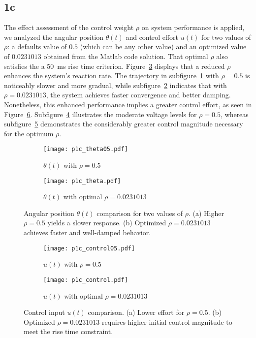 \documentclass{article}
\begin{document}
\subsection*{1c}
The effect assessment of the control weight $\rho$ on system performance is applied, we analyzed the angular position $\theta(t)$ and control effort $u(t)$ for two values of $\rho$: a defaults value of $0.5$ (which can be any other value) and an optimized value of $0.0231013$ obtained from the Matlab code solution. That optimal $\rho$ also satisfies the a 50~ms rise time criterion.
Figure~\ref{fig:theta_comparison} displays that a reduced $\rho$ enhances the system's reaction rate. The trajectory in subfigure~\ref{fig:theta_a} with $\rho = 0.5$ is noticeably slower and more gradual, while subfigure~\ref{fig:theta_b} indicates that with $\rho = 0.0231013$, the system achieves faster convergence and better damping. Nonetheless, this enhanced performance implies a greater control effort, as seen in Figure~\ref{fig:control_comparison}. Subfigure~\ref{fig:control_a} illustrates the moderate voltage levels for $\rho = 0.5$, whereas subfigure~\ref{fig:control_b} demonstrates the considerably greater control magnitude necessary for the optimum $\rho$.

\begin{figure}[H]
    \centering
    \begin{subfigure}[b]{0.45\textwidth}
        \centering
        \texttt{[image: p1c\_theta05.pdf]}
        \caption{$\theta(t)$ with $\rho = 0.5$}
        \label{fig:theta_a}
    \end{subfigure}
    \hfill
    \begin{subfigure}[b]{0.45\textwidth}
        \centering
        \texttt{[image: p1c\_theta.pdf]}
        \caption{$\theta(t)$ with optimal $\rho = 0.0231013$}
        \label{fig:theta_b}
    \end{subfigure}
    \caption{Angular position $\theta(t)$ comparison for two values of $\rho$. (a) Higher $\rho = 0.5$ yields a slower response. (b) Optimized $\rho = 0.0231013$ achieves faster and well-damped behavior.}
    \label{fig:theta_comparison}
\end{figure}
\begin{figure}[H]
    \centering
    \begin{subfigure}[b]{0.45\textwidth}
        \centering
        \texttt{[image: p1c\_control05.pdf]}
        \caption{$u(t)$ with $\rho = 0.5$}
        \label{fig:control_a}
    \end{subfigure}
    \hfill
    \begin{subfigure}[b]{0.45\textwidth}
        \centering
        \texttt{[image: p1c\_control.pdf]}
        \caption{$u(t)$ with optimal $\rho = 0.0231013$}
        \label{fig:control_b}
    \end{subfigure}
    \caption{Control input $u(t)$ comparison. (a) Lower effort for $\rho = 0.5$. (b) Optimized $\rho = 0.0231013$ requires higher initial control magnitude to meet the rise time constraint.}
    \label{fig:control_comparison}
\end{figure}
\end{document}
